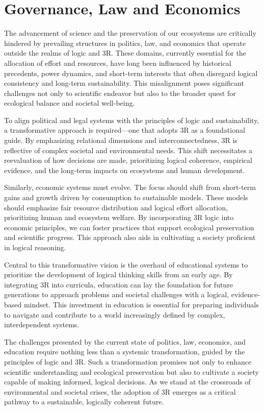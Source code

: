 \documentclass[12pt]{article}
\begin{document}
\section*{Governance, Law and Economics}

The advancement of science and the preservation of our ecosystems are critically hindered by prevailing structures in politics, law, and economics that operate outside the realms of logic and 3R. These domains, currently essential for the allocation of effort and resources, have long been influenced by historical precedents, power dynamics, and short-term interests that often disregard logical consistency and long-term sustainability. This misalignment poses significant challenges not only to scientific endeavor but also to the broader quest for ecological balance and societal well-being.

To align political and legal systems with the principles of logic and sustainability, a transformative approach is required—one that adopts 3R as a foundational guide. By emphasizing relational dimensions and interconnectedness, 3R is reflective of complex societal and environmental needs. This shift necessitates a reevaluation of how decisions are made, prioritizing logical coherence, empirical evidence, and the long-term impacts on ecosystems and human development.

Similarly, economic systems must evolve. The focus should shift from short-term gains and growth driven by consumption to sustainable models. These models should emphasize fair resource distribution and logical effort allocation, prioritizing human and ecosystem welfare. By incorporating 3R logic into economic principles, we can foster practices that support ecological preservation and scientific progress. This approach also aids in cultivating a society proficient in logical reasoning.


Central to this transformative vision is the overhaul of educational systems to prioritize the development of logical thinking skills from an early age. By integrating 3R into curricula, education can lay the foundation for future generations to approach problems and societal challenges with a logical, evidence-based mindset. This investment in education is essential for preparing individuals to navigate and contribute to a world increasingly defined by complex, interdependent systems.

The challenges presented by the current state of politics, law, economics, and education require nothing less than a systemic transformation, guided by the principles of logic and 3R. Such a transformation promises not only to enhance scientific understanding and ecological preservation but also to cultivate a society capable of making informed, logical decisions. As we stand at the crossroads of environmental and societal crises, the adoption of 3R emerges as a critical pathway to a sustainable, logically coherent future.
\end{document}
